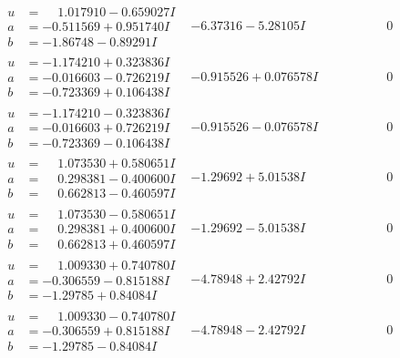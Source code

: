 \documentclass[1p]{elsarticle_modified}
\theoremstyle{definition}
\begin{document}
$$\begin{array}{c|c|c}
\begin{aligned}
u &= \phantom{-}1.017910 - 0.659027 I \\
a &= -0.511569 + 0.951740 I \\
b &= -1.86748 - 0.89291 I\end{aligned}
 & -6.37316 - 5.28105 I & \phantom{-0.000000 } 0 \\ \hline\begin{aligned}
u &= -1.174210 + 0.323836 I \\
a &= -0.016603 - 0.726219 I \\
b &= -0.723369 + 0.106438 I\end{aligned}
 & -0.915526 + 0.076578 I & \phantom{-0.000000 } 0 \\ \hline\begin{aligned}
u &= -1.174210 - 0.323836 I \\
a &= -0.016603 + 0.726219 I \\
b &= -0.723369 - 0.106438 I\end{aligned}
 & -0.915526 - 0.076578 I & \phantom{-0.000000 } 0 \\ \hline\begin{aligned}
u &= \phantom{-}1.073530 + 0.580651 I \\
a &= \phantom{-}0.298381 - 0.400600 I \\
b &= \phantom{-}0.662813 - 0.460597 I\end{aligned}
 & -1.29692 + 5.01538 I & \phantom{-0.000000 } 0 \\ \hline\begin{aligned}
u &= \phantom{-}1.073530 - 0.580651 I \\
a &= \phantom{-}0.298381 + 0.400600 I \\
b &= \phantom{-}0.662813 + 0.460597 I\end{aligned}
 & -1.29692 - 5.01538 I & \phantom{-0.000000 } 0 \\ \hline\begin{aligned}
u &= \phantom{-}1.009330 + 0.740780 I \\
a &= -0.306559 - 0.815188 I \\
b &= -1.29785 + 0.84084 I\end{aligned}
 & -4.78948 + 2.42792 I & \phantom{-0.000000 } 0 \\ \hline\begin{aligned}
u &= \phantom{-}1.009330 - 0.740780 I \\
a &= -0.306559 + 0.815188 I \\
b &= -1.29785 - 0.84084 I\end{aligned}
 & -4.78948 - 2.42792 I & \phantom{-0.000000 } 0\\

\end{array}$$
\end{document}
